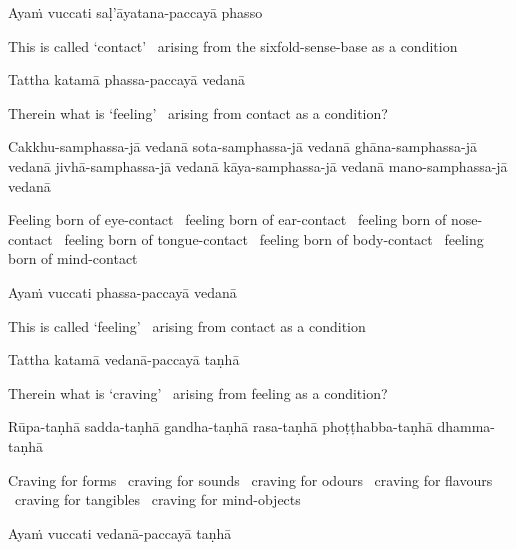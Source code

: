 Ayaṁ vuccati saḷ'āyatana-paccayā phasso

\begin{english-hang}
  This is called `contact' \breathmark\ arising from the sixfold-sense-base as a condition
\end{english-hang}

Tattha katamā phassa-paccayā vedanā

\begin{english}
  Therein what is `feeling' \breathmark\ arising from contact as a condition?
\end{english}

\begin{pali-hang}
  Cakkhu-samphassa-jā vedanā sota-samphassa-jā vedanā ghāna-samphassa-jā vedanā jivhā-samphassa-jā vedanā kāya-samphassa-jā vedanā mano-samphassa-jā vedanā
\end{pali-hang}

\begin{english-hang-verses}
  Feeling born of eye-contact \breathmark\ feeling born of ear-contact \breathmark\
  feeling born of nose-contact \breathmark\ feeling born of tongue-contact \breathmark\ feeling born of body-contact \breathmark\ feeling born of mind-contact
\end{english-hang-verses}

Ayaṁ vuccati phassa-paccayā vedanā

\begin{english}
  This is called `feeling' \breathmark\ arising from contact as a condition
\end{english}

Tattha katamā vedanā-paccayā taṇhā

\begin{english}
  Therein what is `craving' \breathmark\ arising from feeling as a condition?
\end{english}

\begin{pali-hang}
  Rūpa-taṇhā sadda-taṇhā gandha-taṇhā rasa-taṇhā phoṭṭhabba-taṇhā dhamma-taṇhā
\end{pali-hang}

\begin{english-hang}
  Craving for forms \breathmark\ craving for sounds \breathmark\ craving for odours \breathmark\ craving for flavours \breathmark\ craving for tangibles \breathmark\ craving for mind-objects
\end{english-hang}

Ayaṁ vuccati vedanā-paccayā taṇhā

